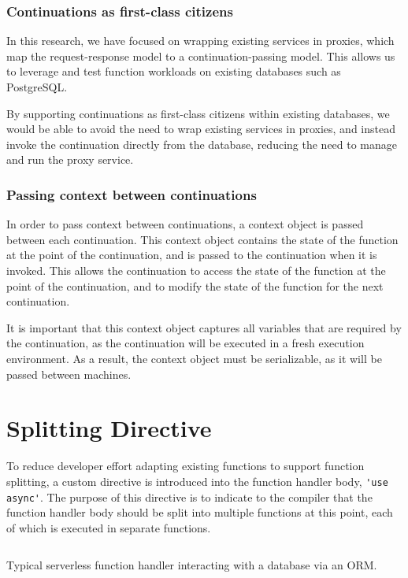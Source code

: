 \subsubsection{Continuations as first-class citizens}
In this research, we have focused on wrapping existing services in proxies, which map the request-response model to a continuation-passing model. This allows us to leverage and test function workloads on existing databases such as PostgreSQL.

By supporting continuations as first-class citizens within existing databases, we would be able to avoid the need to wrap existing services in proxies, and instead invoke the continuation directly from the database, reducing the need to manage and run the proxy service.

\subsubsection{Passing context between continuations}
In order to pass context between continuations, a context object is passed between each continuation. This context object contains the state of the function at the point of the continuation, and is passed to the continuation when it is invoked. This allows the continuation to access the state of the function at the point of the continuation, and to modify the state of the function for the next continuation.

It is important that this context object captures all variables that are required by the continuation, as the continuation will be executed in a fresh execution environment. As a result, the context object must be serializable, as it will be passed between machines.

\section{Splitting Directive}
To reduce developer effort adapting existing functions to support function splitting, a custom directive is introduced into the function handler body, \verb|'use async'|. The purpose of this directive is to indicate to the \faaasc{} compiler that the function handler body should be split into multiple functions at this point, each of which is executed in separate \awslambda{} functions.

\begin{listing}[H]
  \inputminted{javascript}{node_modules/@faaas-bench/hello-seq/src/onHttpGetHello.trigger.ts}
  \caption{Typical serverless function handler interacting with a database via an ORM.}
\end{listing}

